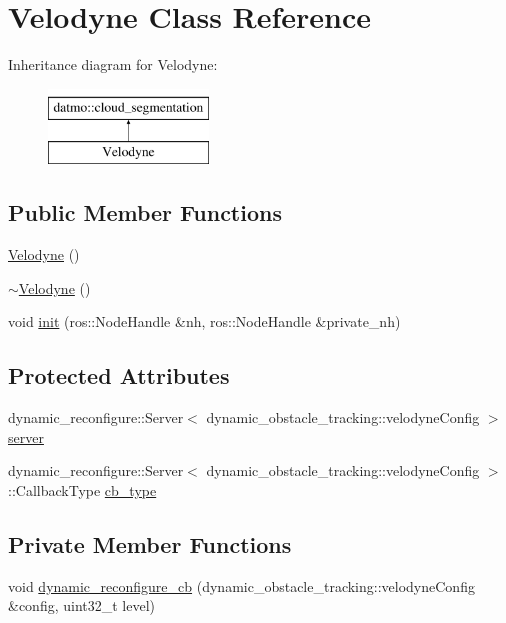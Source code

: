 \hypertarget{classVelodyne}{}\section{Velodyne Class Reference}
\label{classVelodyne}
Inheritance diagram for Velodyne\+:\begin{figure}[H]
\begin{center}
\leavevmode
\includegraphics[height=2.000000cm]{classVelodyne}
\end{center}
\end{figure}
\subsection*{Public Member Functions}
\begin{DoxyCompactItemize}
\item 
\hyperlink{classVelodyne_aea299a13d4d1de508599627f52cf958c}{Velodyne} ()
\item 
\hyperlink{classVelodyne_a4e6654c8d061f82a062af273d75bbede}{$\sim$\+Velodyne} ()
\item 
void \hyperlink{classVelodyne_acc1ec7c74ba56c6330d94481960459a1}{init} (ros\+::\+Node\+Handle \&nh, ros\+::\+Node\+Handle \&private\+\_\+nh)
\end{DoxyCompactItemize}
\subsection*{Protected Attributes}
\begin{DoxyCompactItemize}
\item 
dynamic\+\_\+reconfigure\+::\+Server$<$ dynamic\+\_\+obstacle\+\_\+tracking\+::velodyne\+Config $>$ \hyperlink{classVelodyne_ae3c8869e849b22dad034e50dfbfccc1d}{server}
\item 
dynamic\+\_\+reconfigure\+::\+Server$<$ dynamic\+\_\+obstacle\+\_\+tracking\+::velodyne\+Config $>$\+::Callback\+Type \hyperlink{classVelodyne_aba02cf51ec41e7289dc2df2511d421ce}{cb\+\_\+type}
\end{DoxyCompactItemize}
\subsection*{Private Member Functions}
\begin{DoxyCompactItemize}
\item 
void \hyperlink{classVelodyne_a1a2fc80abf53b67444e0d6cc6916271a}{dynamic\+\_\+reconfigure\+\_\+cb} (dynamic\+\_\+obstacle\+\_\+tracking\+::velodyne\+Config \&config, uint32\+\_\+t level)
\end{DoxyCompactItemize}



